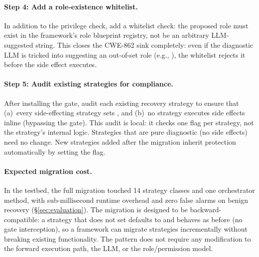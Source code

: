 \paragraph{Step 4: Add a role-existence whitelist.}
In addition to the privilege check, add a whitelist check: the proposed role must exist in the framework's role blueprint registry, not be an arbitrary LLM-suggested string. This closes the CWE-862 sink completely: even if the diagnostic LLM is tricked into suggesting an out-of-set role (e.g., ), the whitelist rejects it before the side effect executes.

\paragraph{Step 5: Audit existing strategies for compliance.}
After installing the gate, audit each existing recovery strategy to ensure that (a)~every side-effecting strategy sets , and (b)~no strategy executes side effects inline (bypassing the gate). This audit is local: it checks one flag per strategy, not the strategy's internal logic. Strategies that are pure diagnostic (no side effects) need no change. New strategies added after the migration inherit protection automatically by setting the flag.

\paragraph{Expected migration cost.}
In the \system{} testbed, the full migration touched 14 strategy classes and one orchestrator method, with sub-millisecond runtime overhead and zero false alarms on benign recovery (\S\ref{sec:evaluation}). The migration is designed to be backward-compatible: a strategy that does not set  defaults to  and behaves as before (no gate interception), so a framework can migrate strategies incrementally without breaking existing functionality. The pattern does not require any modification to the forward execution path, the LLM, or the role/permission model.
